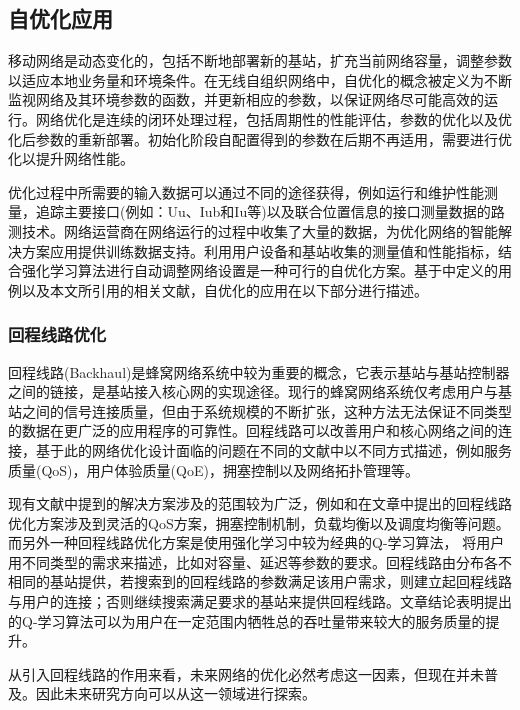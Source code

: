 \documentclass{IEEEtran}
\begin{document}
\subsection{自优化应用}
\label{sec:self-optimization}
移动网络是动态变化的，包括不断地部署新的基站，扩充当前网络容量，调整参数以适应本地业务量和环境条件。在无线自组织网络中，自优化的概念被定义为不断监视网络及其环境参数的函数，并更新相应的参数，以保证网络尽可能高效的运行\cite{Aliu2013}。网络优化是连续的闭环处理过程，包括周期性的性能评估，参数的优化以及优化后参数的重新部署。初始化阶段自配置得到的参数在后期不再适用，需要进行优化以提升网络性能。

优化过程中所需要的输入数据可以通过不同的途径获得，例如运行和维护性能测量，追踪主要接口(例如：Uu、Iub和Iu等)以及联合位置信息的接口测量数据的路测技术。网络运营商在网络运行的过程中收集了大量的数据，为优化网络的智能解决方案应用提供训练数据支持。利用用户设备和基站收集的测量值和性能指标，结合强化学习算法进行自动调整网络设置是一种可行的自优化方案。基于\cite{3gpp.36.902}中定义的用例以及本文所引用的相关文献，自优化的应用在以下部分进行描述。

\subsubsection{回程线路优化}

回程线路(Backhaul)是蜂窝网络系统中较为重要的概念，它表示基站与基站控制器之间的链接，是基站接入核心网的实现途径。现行的蜂窝网络系统仅考虑用户与基站之间的信号连接质量，但由于系统规模的不断扩张，这种方法无法保证不同类型的数据在更广泛的应用程序的可靠性。回程线路可以改善用户和核心网络之间的连接，基于此的网络优化设计面临的问题在不同的文献中以不同方式描述，例如服务质量(QoS)，用户体验质量(QoE)，拥塞控制以及网络拓扑管理等。

现有文献中提到的解决方案涉及的范围较为广泛，例如\cite{Wainio2016}和\cite{Chen2015}在文章中提出的回程线路优化方案涉及到灵活的QoS方案，拥塞控制机制，负载均衡以及调度均衡等问题。而另外一种回程线路优化方案是使用强化学习中较为经典的Q-学习算法，\cite{Jaber2015}\cite{Jaber2016a}\cite{Jaber2016c} 将用户用不同类型的需求来描述，比如对容量、延迟等参数的要求。回程线路由分布各不相同的基站提供，若搜索到的回程线路的参数满足该用户需求，则建立起回程线路与用户的连接；否则继续搜索满足要求的基站来提供回程线路。文章结论表明提出的Q-学习算法可以为用户在一定范围内牺牲总的吞吐量带来较大的服务质量的提升。

从引入回程线路的作用来看，未来网络的优化必然考虑这一因素，但现在并未普及。因此未来研究方向可以从这一领域进行探索。
\end{document}
